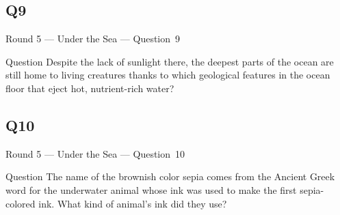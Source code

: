 \documentclass[11pt]{beamer}
\begin{document}
\subsection*{Q9}
\begin{frame}[t]{Round 5 --- Under the Sea --- \mbox{Question 9}}
\vspace{-0.5em}
\begin{block}{Question}
Despite the lack of sunlight there, the deepest parts of the ocean are still home to living creatures thanks to which geological features in the ocean floor that eject hot, nutrient-rich water?
\end{block}
\end{frame}
\subsection*{Q10}
\begin{frame}[t]{Round 5 --- Under the Sea --- \mbox{Question 10}}
\vspace{-0.5em}
\begin{block}{Question}
The name of the brownish color sepia comes from the Ancient Greek word for the underwater animal whose ink was used to make the first sepia-colored ink. What kind of animal's ink did they use?
\end{block}
\end{frame}
\end{document}
